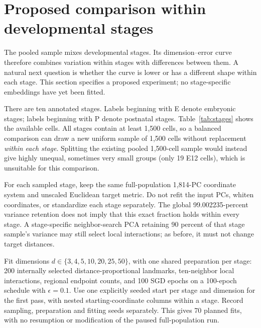 \section{Proposed comparison within developmental stages}
The pooled sample mixes developmental stages. Its dimension--error curve
therefore combines variation within stages with differences between them.
A natural next question is whether the curve is lower or has a different
shape within each stage. This section specifies a proposed experiment;
no stage-specific embeddings have yet been fitted.

There are ten annotated stages. Labels beginning with E denote embryonic
stages; labels beginning with P denote postnatal stages. Table~\ref{tab:stages}
shows the available cells. All stages contain at least 1,500 cells, so a
balanced comparison can draw a new uniform sample of 1,500 cells without
replacement \emph{within each stage}. Splitting the existing pooled
1,500-cell sample would instead give highly unequal, sometimes very small
groups (only 19 E12 cells), which is unsuitable for this comparison.

\begin{table}[htbp]
\centering
\caption{Available developmental-stage annotations in the 120,804-cell
input and the proposed sample size per stage. Counts are cells, not
biological replicates. Stages are ordered developmentally. No stage is
excluded under the proposed balanced sampling rule.}
\label{tab:stages}
\end{table}

For each sampled stage, keep the same full-population 1,814-PC coordinate
system and unscaled Euclidean target metric. Do not refit the input PCs,
whiten coordinates, or standardize each stage separately. The global
99.002235-percent variance retention does not imply that this exact fraction
holds within every stage. A stage-specific neighbor-search PCA retaining
90 percent of that stage sample's variance may still select local
interactions; as before, it must not change target distances.

Fit dimensions $d\in\{3,4,5,10,20,25,50\}$, with one shared preparation
per stage: 200 internally selected distance-proportional landmarks,
ten-neighbor local interactions, regional endpoint counts, and 100 SGD
epochs on a 100-epoch schedule with $\epsilon=0.1$. Use one explicitly
seeded start per stage and dimension for the first pass, with nested
starting-coordinate columns within a stage. Record sampling, preparation
and fitting seeds separately. This gives 70 planned fits, with no
resumption or modification of the paused full-population run.

